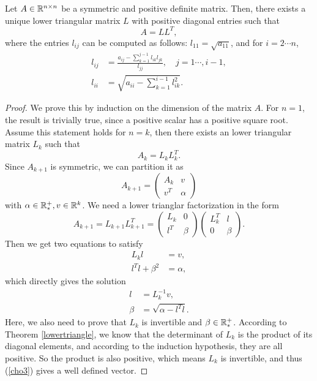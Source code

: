 \begin{theorem}
\label{cholesky}
Let \(A\in\mathbb{R}^{n\times n}\) be a symmetric and positive definite matrix.
Then, there exists a unique lower triangular matrix $L$ with positive diagonal entries such that
\[ A=LL^T, \]
where the entries \(l_{ij}\) can be computed as follows: \(l_{11}=\sqrt{a_{11}}\), and for \(i=2\cdots n\),
\begin{align}
l_{ij}&=\frac{a_{ij}-\sum_{k=1}^{j-1}l_{ik}l_{jk}}{l_{jj}}, \quad j=1\cdots,i-1, \label{cho1}\\
l_{ii}&=\sqrt{a_{ii}-\sum_{k=1}^{i-1}l_{ik}^2} \label{cho2}.
\end{align}
\end{theorem}
\begin{proof}
We prove this by induction on the dimension of the matrix $A$.
For \(n=1\), the result is trivially true, since a positive scalar has a positive square root.
Assume this statement holds for \(n=k\), then there exists an lower triangular matrix \(L_k\) such that
\[ A_k=L_k L_k^T. \]
Since \(A_{k+1}\) is symmetric, we can partition it as
\[ A_{k+1}=\begin{pmatrix} A_k & v \\ v^T & \alpha \end{pmatrix} \]
with \(\alpha\in\mathbb{R}_*^{+},v\in\mathbb{R}^k\).
We need a lower trianglar factorization in the form
\[ A_{k+1}=L_{k+1}L_{k+1}^T=\begin{pmatrix} L_k & 0 \\  l^T & \beta \end{pmatrix}\begin{pmatrix} L_k^T & l \\  0 & \beta \end{pmatrix}. \]
Then we get two equations to satisfy
\begin{align*}
	L_k l&=v,\\
	l^T l+\beta^2&=\alpha,
\end{align*}
which directly gives the solution
\begin{align}
l&=L_k^{-1}v, \label{cho3}\\
\beta&=\sqrt{\alpha-l^Tl} \label{cho4}.
\end{align}
Here, we also need to prove that \(L_k\) is invertible and \(\beta\in\mathbb{R}_*^+\).
According to Theorem \ref{lowertriangle}, we know that the determinant of \(L_k\) is the product of its diagonal elements, and according to the induction hypothesis, they are all positive.
So the product is also positive, which means \(L_k\) is invertible, and thus (\ref{cho3}) gives a well defined vector.

\end{proof}
